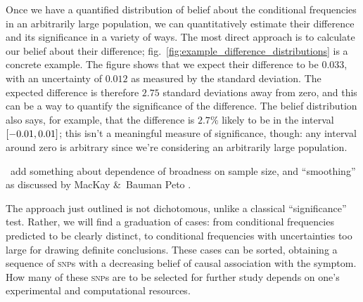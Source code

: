 \documentclass[\ifafour a4paper,12pt,\else a5paper,10pt,\fi%
onecolumn,oneside,article,%
british%
]{memoir}
\theoremstyle{remark}
\theoremstyle{innote}
\newcommand*{\citey}{\parencites*}
\newcommand*{\amp}{\&}
\DeclarePairedDelimiter\clcl{[}{]}
\newcommand*{\pf}{\mathrm{p}}%
\renewcommand*{\|}{\mathpunct{|}}
\newcommand*{\sect}{\S}%
\newcommand*{\fig}{fig.}%
\newcommand*{\puzzle}{\maltese}
\newcommand{\mynote}[1]{ {\color{notecolour}\puzzle\ #1}}
\newcommand*{\ptext}[1]{\text{\small #1}}
\newcommand*{\snp}{\textsc{snp}}
\begin{document}
Once we have a quantified distribution of belief about the conditional
frequencies in an arbitrarily large population, we can quantitatively
estimate their difference and its significance in a variety of ways. The
most direct approach is to calculate our belief about their difference;
\fig~\ref{fig:example_difference_distributions} is a concrete example. The
figure shows that we expect their difference to be $0.033$, with an
uncertainty of $0.012$ as measured by the standard deviation. The expected
difference is therefore $2.75$ standard deviations away from zero, and this
can be a way to quantify the significance of the difference. The belief
distribution also says, for example, that the difference is $2.7\%$ likely
to be in the interval $\clcl{-0.01,0.01}$; this isn't a meaningful measure
of significance, though: any interval around zero is arbitrary since we're
considering an arbitrarily large population.


\mynote{add something about dependence of broadness on sample size, and
  \enquote{smoothing} as discussed by MacKay \amp\ Bauman Peto
  \citey[\sect~2.6]{mackayetal1995}.}

The approach just outlined is not dichotomous, unlike a classical
\enquote{significance} test. Rather, we will find a graduation of cases:
from conditional frequencies predicted to be clearly distinct, to
conditional frequencies with uncertainties too large for drawing definite
conclusions. These cases can be sorted, obtaining a sequence of \snp s with
a decreasing belief of causal association with the symptom. How many of
these \snp s are to be selected for further study depends on one's
experimental and computational resources.
\end{document}

